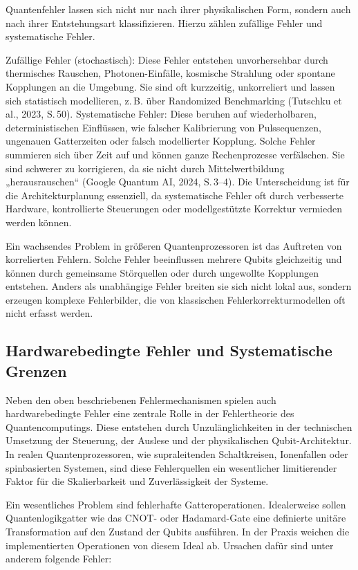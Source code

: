 Quantenfehler lassen sich nicht nur nach ihrer physikalischen Form, sondern auch nach ihrer Entstehungsart klassifizieren. Hierzu zählen zufällige Fehler und systematische Fehler.

Zufällige Fehler (stochastisch): Diese Fehler entstehen unvorhersehbar durch thermisches Rauschen, Photonen-Einfälle, kosmische Strahlung oder spontane Kopplungen an die Umgebung. Sie sind oft kurzzeitig, unkorreliert und lassen sich statistisch modellieren, z. B. über Randomized Benchmarking (Tutschku et al., 2023, S. 50).
Systematische Fehler: Diese beruhen auf wiederholbaren, deterministischen Einflüssen, wie falscher Kalibrierung von Pulssequenzen, ungenauen Gatterzeiten oder falsch modellierter Kopplung. Solche Fehler summieren sich über Zeit auf und können ganze Rechenprozesse verfälschen. Sie sind schwerer zu korrigieren, da sie nicht durch Mittelwertbildung „herausrauschen“ (Google Quantum AI, 2024, S. 3–4).
Die Unterscheidung ist für die Architekturplanung essenziell, da systematische Fehler oft durch verbesserte Hardware, kontrollierte Steuerungen oder modellgestützte Korrektur vermieden werden können.

Ein wachsendes Problem in größeren Quantenprozessoren ist das Auftreten von korrelierten Fehlern. Solche Fehler beeinflussen mehrere Qubits gleichzeitig und können durch gemeinsame Störquellen oder durch ungewollte Kopplungen entstehen. Anders als unabhängige Fehler breiten sie sich nicht lokal aus, sondern erzeugen komplexe Fehlerbilder, die von klassischen Fehlerkorrekturmodellen oft nicht erfasst werden.


\subsection{Hardwarebedingte Fehler und Systematische Grenzen}
Neben den oben beschriebenen Fehlermechanismen spielen auch hardwarebedingte Fehler eine zentrale Rolle in der Fehlertheorie des Quantencomputings. Diese entstehen durch Unzulänglichkeiten in der technischen Umsetzung der Steuerung, der Auslese und der physikalischen Qubit-Architektur. In realen Quantenprozessoren, wie supraleitenden Schaltkreisen, Ionenfallen oder spinbasierten Systemen, sind diese Fehlerquellen ein wesentlicher limitierender Faktor für die Skalierbarkeit und Zuverlässigkeit der Systeme.

Ein wesentliches Problem sind fehlerhafte Gatteroperationen. Idealerweise sollen Quantenlogikgatter wie das CNOT- oder Hadamard-Gate eine definierte unitäre Transformation auf den Zustand der Qubits ausführen. In der Praxis weichen die implementierten Operationen von diesem Ideal ab. Ursachen dafür sind unter anderem folgende Fehler:

